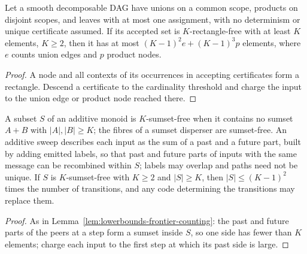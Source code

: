\begin{theorem}
  \label{thm:lowerbounds-frontier-decomposable}
  \leanok
  Let a smooth decomposable DAG have unions on a common scope, products on disjoint
  scopes, and leaves with at most one assignment, with no determinism or unique
  certificate assumed. If its accepted set is $K$-rectangle-free with at least $K$
  elements, $K\ge2$, then it has at most $(K-1)^2e+(K-1)^3p$ elements, where $e$
  counts union edges and $p$ product nodes.
\end{theorem}
\begin{proof}
  \leanok
  A node and all contexts of its occurrences in accepting certificates form a
  rectangle. Descend a certificate to the cardinality threshold and charge the
  input to the union edge or product node reached there.
\end{proof}

\begin{theorem}
  \label{thm:lowerbounds-frontier-additive}
  \leanok
  A subset $S$ of an additive monoid is $K$-sumset-free when it contains no sumset
  $A+B$ with $|A|,|B|\ge K$; the fibres of a sumset disperser are sumset-free.
  An additive sweep describes each input as the sum of a past and a future part,
  built by adding emitted labels, so that past and future parts of inputs with the
  same message can be recombined within $S$; labels may overlap and paths need not
  be unique. If $S$ is $K$-sumset-free with $K\ge2$ and $|S|\ge K$, then
  $|S|\le(K-1)^2$ times the number of transitions, and any code determining the
  transitions may replace them.
\end{theorem}
\begin{proof}
  \leanok
  As in Lemma~\ref{lem:lowerbounds-frontier-counting}: the past and future parts of
  the peers at a step form a sumset inside $S$, so one side has fewer than $K$
  elements; charge each input to the first step at which its past side is large.
\end{proof}

